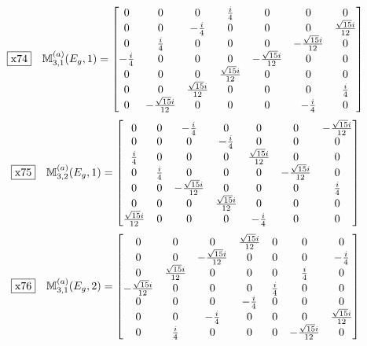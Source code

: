 \documentclass[fleqn,10pt,landscape]{jsarticle}
\begin{document}
\begin{dmath*}
\fbox{x74}\quad \mathbb{M}_{3,1}^{(a)}(E_{g},1)=\begin{bmatrix} 0 & 0 & 0 & \frac{i}{4} & 0 & 0 & 0 \\ 0 & 0 & - \frac{i}{4} & 0 & 0 & 0 & \frac{\sqrt{15} i}{12} \\ 0 & \frac{i}{4} & 0 & 0 & 0 & - \frac{\sqrt{15} i}{12} & 0 \\ - \frac{i}{4} & 0 & 0 & 0 & - \frac{\sqrt{15} i}{12} & 0 & 0 \\ 0 & 0 & 0 & \frac{\sqrt{15} i}{12} & 0 & 0 & 0 \\ 0 & 0 & \frac{\sqrt{15} i}{12} & 0 & 0 & 0 & \frac{i}{4} \\ 0 & - \frac{\sqrt{15} i}{12} & 0 & 0 & 0 & - \frac{i}{4} & 0 \end{bmatrix}
\end{dmath*}
\begin{dmath*}
\fbox{x75}\quad \mathbb{M}_{3,2}^{(a)}(E_{g},1)=\begin{bmatrix} 0 & 0 & - \frac{i}{4} & 0 & 0 & 0 & - \frac{\sqrt{15} i}{12} \\ 0 & 0 & 0 & - \frac{i}{4} & 0 & 0 & 0 \\ \frac{i}{4} & 0 & 0 & 0 & \frac{\sqrt{15} i}{12} & 0 & 0 \\ 0 & \frac{i}{4} & 0 & 0 & 0 & - \frac{\sqrt{15} i}{12} & 0 \\ 0 & 0 & - \frac{\sqrt{15} i}{12} & 0 & 0 & 0 & \frac{i}{4} \\ 0 & 0 & 0 & \frac{\sqrt{15} i}{12} & 0 & 0 & 0 \\ \frac{\sqrt{15} i}{12} & 0 & 0 & 0 & - \frac{i}{4} & 0 & 0 \end{bmatrix}
\end{dmath*}
\begin{dmath*}
\fbox{x76}\quad \mathbb{M}_{3,1}^{(a)}(E_{g},2)=\begin{bmatrix} 0 & 0 & 0 & \frac{\sqrt{15} i}{12} & 0 & 0 & 0 \\ 0 & 0 & - \frac{\sqrt{15} i}{12} & 0 & 0 & 0 & - \frac{i}{4} \\ 0 & \frac{\sqrt{15} i}{12} & 0 & 0 & 0 & \frac{i}{4} & 0 \\ - \frac{\sqrt{15} i}{12} & 0 & 0 & 0 & \frac{i}{4} & 0 & 0 \\ 0 & 0 & 0 & - \frac{i}{4} & 0 & 0 & 0 \\ 0 & 0 & - \frac{i}{4} & 0 & 0 & 0 & \frac{\sqrt{15} i}{12} \\ 0 & \frac{i}{4} & 0 & 0 & 0 & - \frac{\sqrt{15} i}{12} & 0 \end{bmatrix}
\end{dmath*}
\end{document}
